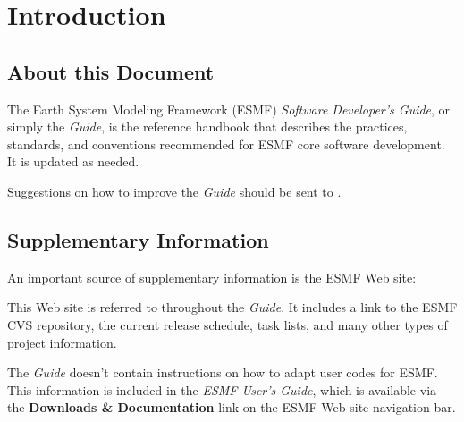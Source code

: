 
\section{Introduction}
\label{sec:intro}

\subsection{About this Document}
The Earth System Modeling Framework (ESMF) {\it Software Developer's Guide},
or simply the {\it Guide}, is the reference handbook that describes
the practices, standards, and conventions recommended for ESMF core software
development.  It is updated as needed.

Suggestions on how to improve the {\it Guide} should be sent to 
.

\subsection{Supplementary Information}
An important source of supplementary information is the ESMF Web site:
\begin{center}
\end{center}
This Web site is referred to throughout the {\it Guide}.  
It includes a link to the ESMF CVS repository, the current release
schedule, task lists, and many other types of project information.

The {\it Guide} doesn't contain instructions on how to adapt user
codes for ESMF.  This information is included in the {\it ESMF User's
Guide}\cite{bib:ESMFusrdoc}, which is available via the
{\bf Downloads \& Documentation} link on the ESMF Web site navigation bar.

